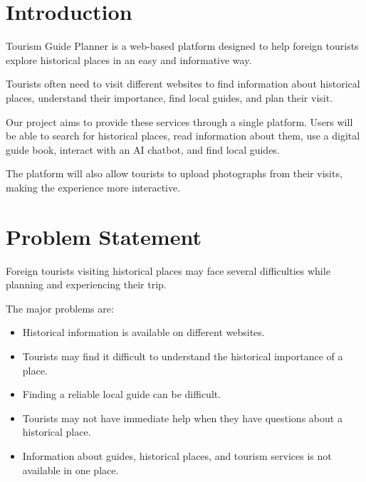 \documentclass[12pt,a4paper]{article}
\begin{document}

\tableofcontents

\newpage



\section{Introduction}

Tourism Guide Planner is a web-based platform designed to help foreign
tourists explore historical places in an easy and informative way.

Tourists often need to visit different websites to find information about
historical places, understand their importance, find local guides, and
plan their visit.

Our project aims to provide these services through a single platform.
Users will be able to search for historical places, read information about
them, use a digital guide book, interact with an AI chatbot, and find
local guides.

The platform will also allow tourists to upload photographs from their
visits, making the experience more interactive.



\section{Problem Statement}

Foreign tourists visiting historical places may face several difficulties
while planning and experiencing their trip.

The major problems are:

\begin{itemize}[leftmargin=*]

    \item Historical information is available on different websites.

    \item Tourists may find it difficult to understand the historical
    importance of a place.

    \item Finding a reliable local guide can be difficult.

    \item Tourists may not have immediate help when they have questions
    about a historical place.

    \item Information about guides, historical places, and tourism services
    is not available in one place.

\end{itemize}
\end{document}
